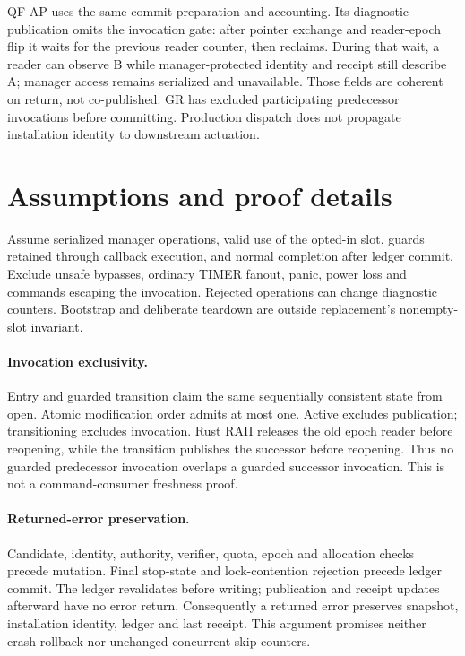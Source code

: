 QF-AP uses the same commit preparation and accounting. Its diagnostic publication omits the invocation gate: after pointer exchange and reader-epoch flip it waits for the previous reader counter, then reclaims. During that wait, a reader can observe B while manager-protected identity and receipt still describe A; manager access remains serialized and unavailable. Those fields are coherent on return, not co-published. GR has excluded participating predecessor invocations before committing. Production dispatch does not propagate installation identity to downstream actuation.

\section{Assumptions and proof details}
\label{app:proofs}
Assume serialized manager operations, valid use of the opted-in slot, guards retained through callback execution, and normal completion after ledger commit. Exclude unsafe bypasses, ordinary TIMER fanout, panic, power loss and commands escaping the invocation. Rejected operations can change diagnostic counters. Bootstrap and deliberate teardown are outside replacement's nonempty-slot invariant.

\paragraph{Invocation exclusivity.}
Entry and guarded transition claim the same sequentially consistent state from open. Atomic modification order admits at most one. Active excludes publication; transitioning excludes invocation. Rust RAII releases the old epoch reader before reopening, while the transition publishes the successor before reopening. Thus no guarded predecessor invocation overlaps a guarded successor invocation. This is not a command-consumer freshness proof.

\paragraph{Returned-error preservation.}
Candidate, identity, authority, verifier, quota, epoch and allocation checks precede mutation. Final stop-state and lock-contention rejection precede ledger commit. The ledger revalidates before writing; publication and receipt updates afterward have no error return. Consequently a returned error preserves snapshot, installation identity, ledger and last receipt. This argument promises neither crash rollback nor unchanged concurrent skip counters.

